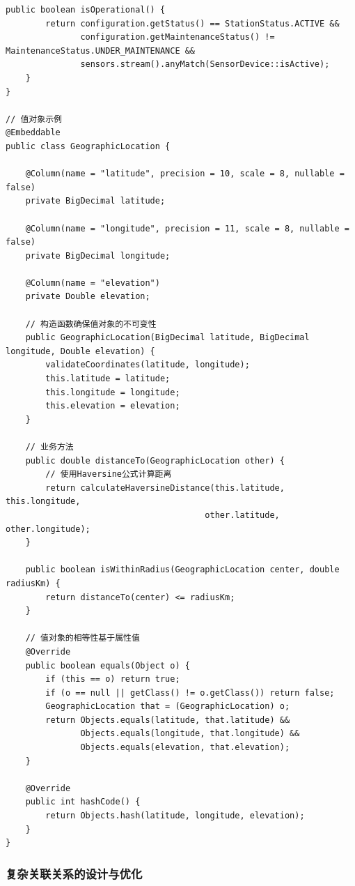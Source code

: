 \begin{lstlisting}[style=java]
    public boolean isOperational() {
        return configuration.getStatus() == StationStatus.ACTIVE &&
               configuration.getMaintenanceStatus() != MaintenanceStatus.UNDER_MAINTENANCE &&
               sensors.stream().anyMatch(SensorDevice::isActive);
    }
}

// 值对象示例
@Embeddable
public class GeographicLocation {
    
    @Column(name = "latitude", precision = 10, scale = 8, nullable = false)
    private BigDecimal latitude;
    
    @Column(name = "longitude", precision = 11, scale = 8, nullable = false)
    private BigDecimal longitude;
    
    @Column(name = "elevation")
    private Double elevation;
    
    // 构造函数确保值对象的不可变性
    public GeographicLocation(BigDecimal latitude, BigDecimal longitude, Double elevation) {
        validateCoordinates(latitude, longitude);
        this.latitude = latitude;
        this.longitude = longitude;
        this.elevation = elevation;
    }
    
    // 业务方法
    public double distanceTo(GeographicLocation other) {
        // 使用Haversine公式计算距离
        return calculateHaversineDistance(this.latitude, this.longitude, 
                                        other.latitude, other.longitude);
    }
    
    public boolean isWithinRadius(GeographicLocation center, double radiusKm) {
        return distanceTo(center) <= radiusKm;
    }
    
    // 值对象的相等性基于属性值
    @Override
    public boolean equals(Object o) {
        if (this == o) return true;
        if (o == null || getClass() != o.getClass()) return false;
        GeographicLocation that = (GeographicLocation) o;
        return Objects.equals(latitude, that.latitude) &&
               Objects.equals(longitude, that.longitude) &&
               Objects.equals(elevation, that.elevation);
    }
    
    @Override
    public int hashCode() {
        return Objects.hash(latitude, longitude, elevation);
    }
}
\end{lstlisting}

\hypertarget{ux590dux6742ux5173ux8054ux5173ux7cfbux7684ux8bbeux8ba1ux4e0eux4f18ux5316}{%
\subsubsection{复杂关联关系的设计与优化}\label{ux590dux6742ux5173ux8054ux5173ux7cfbux7684ux8bbeux8ba1ux4e0eux4f18ux5316}}

